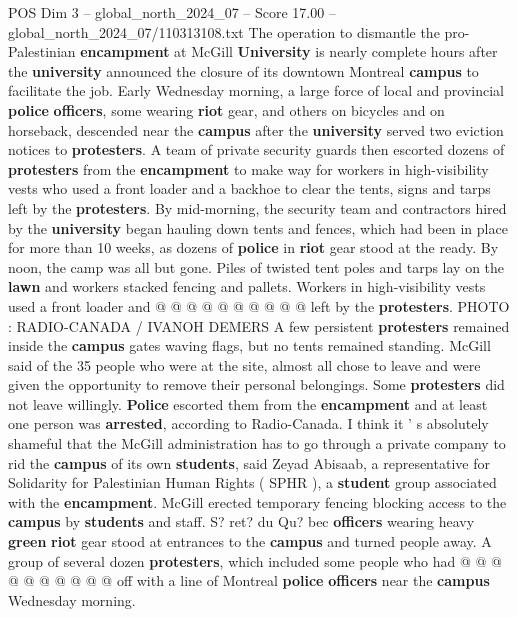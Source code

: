 \begin{textsample}{POS Dim 3 – global\_north\_2024\_07 – Score 17.00 – global\_north\_2024\_07/110313108.txt}  \label{ex:f3_pos_090}
The operation to dismantle the pro-Palestinian \textbf{encampment} at McGill \textbf{University} is nearly complete hours after the \textbf{university} announced the closure of its downtown Montreal \textbf{campus} to facilitate the job.
Early Wednesday morning, a large force of local and provincial \textbf{police} \textbf{officers}, some wearing \textbf{riot} gear, and others on bicycles and on horseback, descended near the \textbf{campus} after the \textbf{university} served two eviction notices to \textbf{protesters}.
A team of private security guards then escorted dozens of \textbf{protesters} from the \textbf{encampment} to make way for workers in high-visibility vests who used a front loader and a backhoe to clear the tents, signs and tarps left by the \textbf{protesters}.
By mid-morning, the security team and contractors hired by the \textbf{university} began hauling down tents and fences, which had been in place for more than 10 weeks, as dozens of \textbf{police} in \textbf{riot} gear stood at the ready.
By noon, the camp was all but gone.
Piles of twisted tent poles and tarps lay on the \textbf{lawn} and workers stacked fencing and pallets.
Workers in high-visibility vests used a front loader and @ @ @ @ @ @ @ @ @ @ left by the \textbf{protesters}.
PHOTO : RADIO-CANADA / IVANOH DEMERS A few persistent \textbf{protesters} remained inside the \textbf{campus} gates waving flags, but no tents remained standing.
McGill said of the 35 people who were at the site, almost all chose to leave and were given the opportunity to remove their personal belongings.
Some \textbf{protesters} did not leave willingly. \textbf{Police} escorted them from the \textbf{encampment} and at least one person was \textbf{arrested}, according to Radio-Canada.
I think it ' s absolutely shameful that the McGill administration has to go through a private company to rid the \textbf{campus} of its own \textbf{students}, said Zeyad Abisaab, a representative for Solidarity for Palestinian Human Rights ( SPHR ), a \textbf{student} group associated with the \textbf{encampment}.
McGill erected temporary fencing blocking access to the \textbf{campus} by \textbf{students} and staff.
S? ret? du Qu? bec \textbf{officers} wearing heavy \textbf{green} \textbf{riot} gear stood at entrances to the \textbf{campus} and turned people away.
A group of several dozen \textbf{protesters}, which included some people who had @ @ @ @ @ @ @ @ @ @ off with a line of Montreal \textbf{police} \textbf{officers} near the \textbf{campus} Wednesday morning.

\end{textsample}
